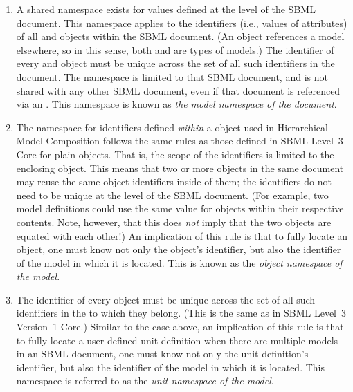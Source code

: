\begin{enumerate}

\item A shared namespace exists for  values defined at the
  level of the SBML document.  This namespace applies to the identifiers
  (i.e., values of  attributes) of all \Model and
  \ExternalModelDefinition objects within the SBML document.  (An
  \ExternalModelDefinition object references a model elsewhere, so in
  this sense, both \Model and \ExternalModelDefinition are types of
  models.)  The identifier of every \Model and \ExternalModelDefinition
  object must be unique across the set of all such identifiers in the
  document.  The namespace is limited to that SBML document, and is not
  shared with any other SBML document, even if that document is
  referenced via an \ExternalModelDefinition.  This namespace is known
  as \emph{the model namespace of the document}.

\item The namespace for  identifiers defined \emph{within}
  a \Model object used in Hierarchical Model Composition follows the
  same rules as those defined in SBML Level~3 Core for plain \Model
  objects.  That is, the scope of the identifiers is limited to the
  enclosing \Model object.  This means that two or more \Model objects
  in the same document may reuse the same object identifiers inside of
  them; the identifiers do not need to be unique at the level of the
  SBML document.  (For example, two model definitions could use the same
   value for \Parameter objects within their respective
  contents.  Note, however, that this does \emph{not} imply that the two
  objects are equated with each other!)  An implication of this rule is
  that to fully locate an object, one must know not only the object's
  identifier, but also the identifier of the model in which it is
  located.  This is known as the \emph{object namespace of the model}.  

\item The identifier of every \UnitDefinition object must be unique
  across the set of all such identifiers in the \Model to which they
  belong.  (This is the same as in SBML Level~3 Version~1 Core.)
  Similar to the case above, an implication of this rule is that to
  fully locate a user-defined unit definition when there are multiple
  models in an SBML document, one must know not only the unit
  definition's identifier, but also the identifier of the model in which
  it is located.  This namespace is referred to as the 
  \emph{unit namespace of the model}.


\end{enumerate}

